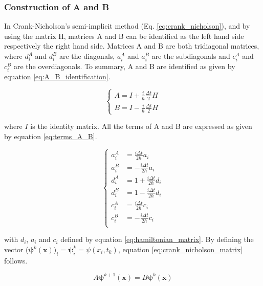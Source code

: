 \documentclass[a4paper,12pt,twoside]{article}
\newcommand{\mbf}[1]{\mathbf{#1}} %
\begin{document}
    \subsubsection{Construction of A and B}
      In Crank-Nicholson's semi-implicit method (Eq. \eqref{eq:crank_nicholson}), and by using the matrix H, matrices A and B can be identified as the left hand side respectively the right hand side.
      Matrices A and B are both tridiagonal matrices, where $d_i^A$ and $d_i^B$ are the diagonals, $a_i^A$ and $a_i^B$ are the subdiagonals and $c_i^A$ and $c_i^B$ are the overdiagonals.
      To summary, A and B are identified as given by equation \eqref{eq:A_B_identification}.

      \begin{equation}
        \begin{cases}
          A = I + \frac{i}{\hbar}\frac{\Delta t}{2}H \\
          B = I - \frac{i}{\hbar}\frac{\Delta t}{2}H
        \end{cases}
        \label{eq:A_B_identification}
      \end{equation}

      where $I$ is the identity matrix.
      All the terms of A and B are expressed as given by equation \eqref{eq:terms_A_B}.

      \begin{equation}
        \begin{cases}
          a_i^A &= \frac{i\Delta t}{2\hbar} a_i\\
          a_i^B &= -\frac{i\Delta t}{2\hbar} a_i\\
          d_i^A &= 1 + \frac{i\Delta t}{2\hbar} d_i\\
          d_i^B &= 1 - \frac{i\Delta t}{2\hbar} d_i\\
          c_i^A &= \frac{i\Delta t}{2\hbar} c_i\\
          c_i^B &= -\frac{i\Delta t}{2\hbar} c_i\\
        \end{cases}
        \label{eq:terms_A_B}
      \end{equation}

      with $d_i$, $a_i$ and $c_i$ defined by equation \eqref{eq:hamiltonian_matrix}.
      By defining the vector ($\mbf{\psi}^k(\mbf{x}))_i = \mbf{\psi}_i^k = \psi(x_i, t_k)$, equation \eqref{eq:crank_nicholson_matrix} follows.

      \begin{equation}
        A\mbf{\psi}^{k+1}(\mbf{x}) = B\mbf{\psi}^k(\mbf{x})
        \label{eq:crank_nicholson_matrix}
      \end{equation}
\end{document}
